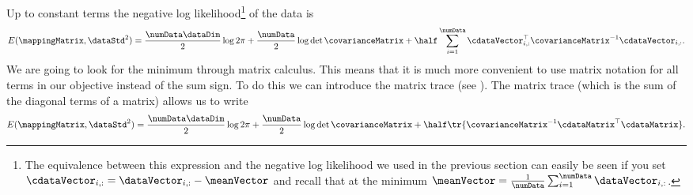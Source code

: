 Up to constant terms the negative log likelihood\footnote{The
  equivalence between this expression and the negative log likelihood
  we used in the previous section can easily be seen if you set
  $\cdataVector_{i, :}=\dataVector_{i, :} - \meanVector$ and recall
  that at the minimum
  $\meanVector=\frac{1}{\numData}\sum_{i=1}^\numData \dataVector_{i,
    :}$.} of the data is
\[
E(\mappingMatrix, \dataStd^2) = \frac{\numData\dataDim}{2}\log 2\pi + \frac{\numData}{2}\log \det{\covarianceMatrix} + \half\sum_{i=1}^\numData\cdataVector_{i, :}^\top \covarianceMatrix^{-1} \cdataVector_{i, :}.
\]
We are going to look for the minimum through matrix calculus. This
means that it is much more convenient to use matrix notation for all
terms in our objective instead of the sum sign. To do this we can
introduce the matrix trace (see ). The matrix trace
(which is the sum of the diagonal terms of a matrix) allows us to
write
\[
E(\mappingMatrix, \dataStd^2) = \frac{\numData\dataDim}{2}\log 2\pi + \frac{\numData}{2}\log \det{\covarianceMatrix} + \half\tr{\covarianceMatrix^{-1} \cdataMatrix^\top \cdataMatrix}.
\]
